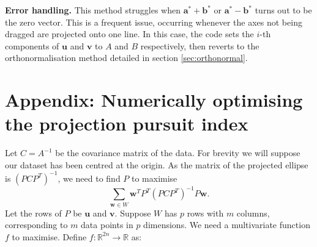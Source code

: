 \documentclass{article}
\renewcommand{\v}[1]{\boldsymbol{#1}}
\begin{document}
\textbf{Error handling.} This method struggles when $\v{a^*} + \v{b^*}$ or $\v{a^*} - \v{b^*}$ turns out to be the zero vector. This is a frequent issue, occurring whenever the axes not being dragged are projected onto one line. In this case, the code sets the $i$-th components of $\v{u}$ and $\v{v}$ to $A$ and $B$ respectively, then reverts to the orthonormalisation method detailed in section \ref{sec:orthonormal}.


\section{Appendix: Numerically optimising the projection pursuit index}
Let $C = A^{-1}$ be the covariance matrix of the data. For brevity we will suppose our dataset has been centred at the origin. As the matrix of the projected ellipse is $(P C P^T)^{-1}$, we need to find $P$ to maximise
\[
\sum_{\v{w}\in W} \v{w}^T P^T (P C P^T)^{-1} P\v{w}.
\]
Let the rows of $P$ be $\v{u}$ and $\v{v}$. Suppose $W$ has $p$ rows with $m$ columns, corresponding to $m$ data points in $p$ dimensions. We need a multivariate function $f$ to maximise. Define $f: \mathbb{R}^{2n} \to \mathbb{R}$ as:
\end{document}
